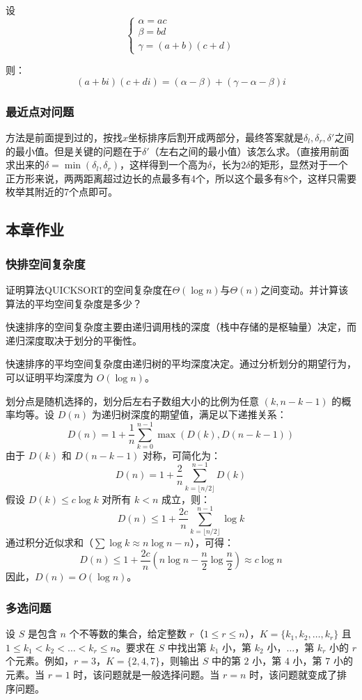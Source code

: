 \documentclass[./../main.tex]{subfiles}
\begin{document}
设
$$
\left\{
\begin{array}{l}
    \alpha = a c \\
    \beta = b d \\
    \gamma = (a + b)(c + d)
\end{array}
\right.
$$

则：
$$
(a+bi)(c+di) = (\alpha - \beta) + (\gamma - \alpha - \beta)i
$$

\subsubsection{最近点对问题}
方法是前面提到过的，按找$x$坐标排序后割开成两部分，最终答案就是$\delta_l,\delta_r,\delta'$之间的最小值。但是关键的问题在于$\delta'$（左右之间的最小值）该怎么求。（直接用前面求出来的$\delta=\min(\delta_l,\delta_r)$，这样得到一个高为$\delta$，长为$2\delta$的矩形，显然对于一个正方形来说，两两距离超过边长的点最多有4个，所以这个最多有8个，这样只需要枚举其附近的7个点即可。

\subsection{本章作业}

\subsubsection{快排空间复杂度}
证明算法QUICKSORT的空间复杂度在$\Theta(\log n)$与$\Theta(n)$之间变动。并计算该算法的平均空间复杂度是多少？

快速排序的空间复杂度主要由递归调用栈的深度（栈中存储的是枢轴量）决定，而递归深度取决于划分的平衡性。

快速排序的平均空间复杂度由递归树的平均深度决定。通过分析划分的期望行为，可以证明平均深度为 $O(\log n)$。

划分点是随机选择的，划分后左右子数组大小的比例为任意 $(k, n-k-1)$ 的概率均等。设 $D(n)$ 为递归树深度的期望值，满足以下递推关系：
$$
D(n) = 1 + \frac{1}{n}\sum_{k=0}^{n-1} \max(D(k), D(n-k-1))
$$
由于 $D(k)$ 和 $D(n-k-1)$ 对称，可简化为：
$$
D(n) = 1 + \frac{2}{n}\sum_{k=\lfloor n/2 \rfloor}^{n-1} D(k)
$$
假设 $D(k) \leq c \log k$ 对所有 $k < n$ 成立，则：
$$
D(n) \leq 1 + \frac{2c}{n}\sum_{k=\lfloor n/2 \rfloor}^{n-1} \log k
$$
通过积分近似求和（$\sum \log k \approx n \log n - n$），可得：
$$
D(n) \leq 1 + \frac{2c}{n}\left(n \log n - \frac{n}{2} \log \frac{n}{2}\right) \approx c \log n
$$
因此，$D(n) = O(\log n)$。


\subsubsection{多选问题}
设 $S$ 是包含 $n$ 个不等数的集合，给定整数 $r$（$1 \leq r \leq n$），$K = \{k_1, k_2, \dots, k_r\}$ 且 $1 \leq k_1 < k_2 < \dots < k_r \leq n$。要求在 $S$ 中找出第 $k_1$ 小，第 $k_2$ 小，$\dots$，第 $k_r$ 小的 $r$ 个元素。例如，$r=3$，$K=\{2,4,7\}$，则输出 $S$ 中的第 $2$ 小，第 $4$ 小，第 $7$ 小的元素。当 $r=1$ 时，该问题就是一般选择问题。当 $r=n$ 时，该问题就变成了排序问题。
\end{document}
